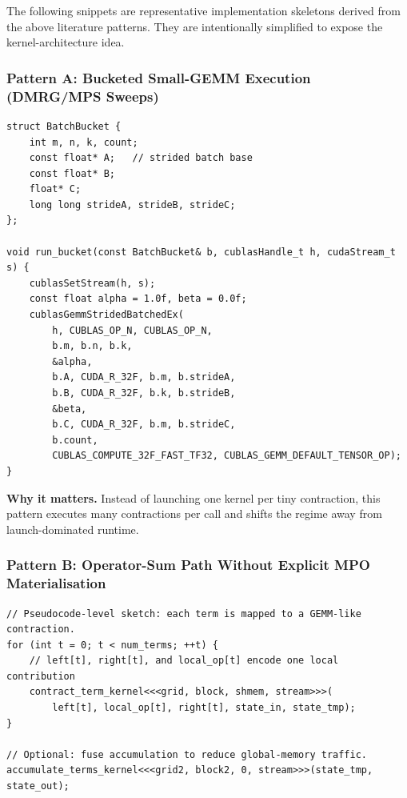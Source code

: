 The following snippets are representative implementation skeletons derived from
the above literature patterns. They are intentionally simplified to expose the
kernel-architecture idea.

\subsubsection{Pattern A: Bucketed Small-GEMM Execution (DMRG/MPS Sweeps)}

\begin{lstlisting}[language=CUDA, caption={Shape-bucketed small contractions using strided batched GEMM. Representative kernel-orchestration pattern inspired by massively parallel DMRG implementations.}, label={lst:sota-bucketed-small-gemm}]
struct BatchBucket {
    int m, n, k, count;
    const float* A;   // strided batch base
    const float* B;
    float* C;
    long long strideA, strideB, strideC;
};

void run_bucket(const BatchBucket& b, cublasHandle_t h, cudaStream_t s) {
    cublasSetStream(h, s);
    const float alpha = 1.0f, beta = 0.0f;
    cublasGemmStridedBatchedEx(
        h, CUBLAS_OP_N, CUBLAS_OP_N,
        b.m, b.n, b.k,
        &alpha,
        b.A, CUDA_R_32F, b.m, b.strideA,
        b.B, CUDA_R_32F, b.k, b.strideB,
        &beta,
        b.C, CUDA_R_32F, b.m, b.strideC,
        b.count,
        CUBLAS_COMPUTE_32F_FAST_TF32, CUBLAS_GEMM_DEFAULT_TENSOR_OP);
}
\end{lstlisting}

\textbf{Why it matters.}
Instead of launching one kernel per tiny contraction, this pattern executes
many contractions per call and shifts the regime away from launch-dominated
runtime.

\subsubsection{Pattern B: Operator-Sum Path Without Explicit MPO Materialisation}

\begin{lstlisting}[language=CUDA, caption={Operator-sum contraction sketch. The core idea is to accumulate local terms directly instead of materialising a large explicit operator tensor first.}, label={lst:sota-operator-sum}]
// Pseudocode-level sketch: each term is mapped to a GEMM-like contraction.
for (int t = 0; t < num_terms; ++t) {
    // left[t], right[t], and local_op[t] encode one local contribution
    contract_term_kernel<<<grid, block, shmem, stream>>>(
        left[t], local_op[t], right[t], state_in, state_tmp);
}

// Optional: fuse accumulation to reduce global-memory traffic.
accumulate_terms_kernel<<<grid2, block2, 0, stream>>>(state_tmp, state_out);
\end{lstlisting}

